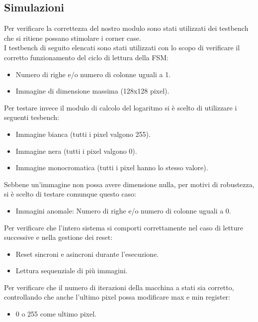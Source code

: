 \documentclass{article}
\begin{document}
\subsection{Simulazioni}
Per verificare la correttezza del nostro modulo sono stati utilizzati dei testbench che si ritiene possano stimolare i corner case.\\
I testbench di seguito elencati sono stati utilizzati con lo scopo di verificare il corretto funzionamento del ciclo di lettura della FSM:
\begin{itemize}
    \item Numero di righe e/o numero di colonne uguali a 1.
    \item Immagine di dimensione massima (128x128 pixel).
\end{itemize}
Per testare invece il modulo di calcolo del logaritmo si è scelto di utilizzare i seguenti tesbench:
\begin{itemize}
    \item Immagine bianca (tutti i pixel valgono 255).
    \item Immagine nera (tutti i pixel valgono 0).
    \item Immagine monocromatica (tutti i pixel hanno lo stesso valore).
\end{itemize}
Sebbene un'immagine non possa avere dimensione nulla, per motivi di robustezza, si è scelto di testare comunque questo caso:
\begin{itemize}
    \item Immagini anomale: Numero di righe e/o numero di colonne uguali a 0.
\end{itemize}
Per verificare che l'intero sistema si comporti correttamente nel caso di letture successive e nella gestione dei reset:
\begin{itemize}
    \item Reset sincroni e asincroni durante l'esecuzione.
\end{itemize}
\begin{itemize}
    \item Lettura sequenziale di più immagini.
\end{itemize}
Per verificare che il numero di iterazioni della macchina a stati sia corretto, controllando che anche l'ultimo pixel possa modificare max e min register:
\begin{itemize}
    \item 0 o 255 come ultimo pixel.
\end{itemize}
\end{document}
